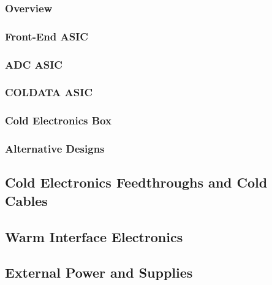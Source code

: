 \subsubsection{Overview}
\label{sec:fdsp-tpc-elec-design-femb-ov}

\subsubsection{Front-End ASIC}
\label{sec:fdsp-tpc-elec-design-femb-fe}

\subsubsection{ADC ASIC}
\label{sec:fdsp-tpc-elec-design-femb-adc}

\subsubsection{COLDATA ASIC}
\label{sec:fdsp-tpc-elec-design-femb-coldata}

\subsubsection{Cold Electronics Box}
\label{sec:fdsp-tpc-elec-design-femb-box}

\subsubsection{Alternative Designs}
\label{sec:fdsp-tpc-elec-design-femb-alt}

\subsection{Cold Electronics Feedthroughs and Cold Cables}
\label{sec:fdsp-tpc-elec-design-ft}

\subsection{Warm Interface Electronics}
\label{sec:fdsp-tpc-elec-design-warm}

\subsection{External Power and Supplies}
\label{sec:fdsp-tpc-elec-design-external}



